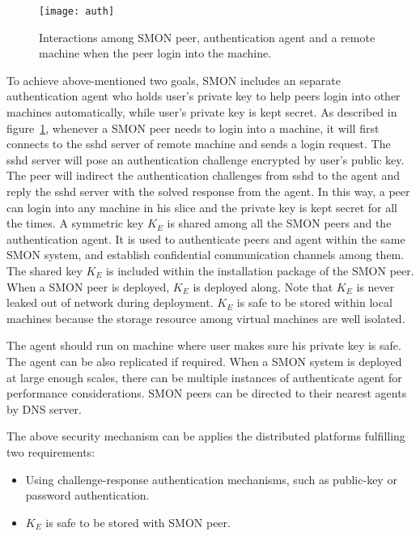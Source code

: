 \begin{figure}
\centering
\texttt{[image: auth]}
\caption{Interactions among SMON peer, authentication agent
and a remote machine when the peer login into the machine.}
\label{fig:auth}
\end{figure}

To achieve above-mentioned two goals, SMON includes an
separate authentication agent who holds user's private key
to help peers login into other machines automatically, while
user's private key is kept secret. As described in
figure~\ref{fig:auth}, whenever a SMON peer needs to login
into a machine, it will first connects to the sshd server of
remote machine and sends a login request. The sshd server
will pose an authentication challenge encrypted by user's
public key. The peer will indirect the authentication
challenges from sshd to the agent and reply the sshd server
with the solved response from the agent. In this way, a peer
can login into any machine in his slice and the private key
is kept secret for all the times. A symmetric key $K_E$ is
shared among all the SMON peers and the authentication
agent. It is used to authenticate peers and agent within the
same SMON system, and establish confidential communication
channels among them. The shared key $K_E$ is included within
the installation package of the SMON peer. When a SMON peer
is deployed, $K_E$ is deployed along. Note that $K_E$ is
never leaked out of network during deployment. $K_E$ is safe
to be stored within local machines because the storage
resource among virtual machines are well isolated.


The agent should run on machine where user makes sure his
private key is safe. The agent can be also replicated if
required. When a SMON system is deployed at large enough
scales, there can be multiple instances of authenticate
agent for performance considerations. SMON peers can be
directed to their nearest agents by DNS server.

The above security mechanism can be applies the distributed
platforms fulfilling two requirements:

\begin{itemize}

  \item Using challenge-response authentication mechanisms,
  such as public-key or password authentication.

  \item $K_E$ is safe to be stored with SMON peer.

\end{itemize}

